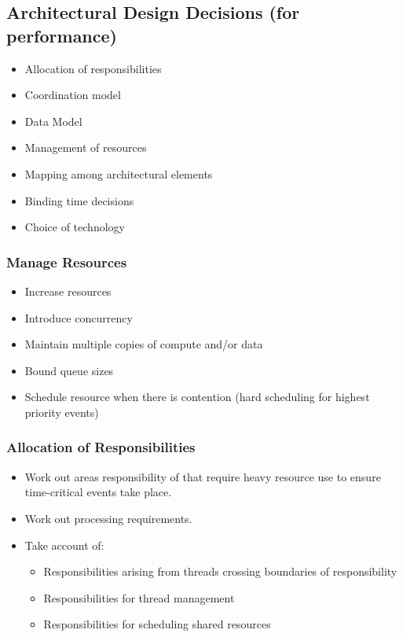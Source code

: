 \documentclass[a4paper]{article}
\begin{document}
\subsection{Architectural Design Decisions (for performance)}
\begin{itemize}
\item{Allocation of responsibilities}
\item{Coordination model}
\item{Data Model}
\item{Management of resources}
\item{Mapping among architectural elements}
\item{Binding time decisions}
\item{Choice of technology}
\end{itemize}

\subsubsection{Manage Resources}

\begin{itemize}
\item{Increase resources}
\item{Introduce concurrency}
\item{Maintain multiple copies of compute and/or data}
\item{Bound queue sizes}
\item{Schedule resource when there is contention (hard scheduling for highest priority events)}
\end{itemize}

\subsubsection{Allocation of Responsibilities}
\begin{itemize}
\item{Work out areas responsibility of that require heavy resource use to ensure time-critical events take place.}
\item{Work out processing requirements.}
\item{Take account of:
	\begin{itemize}
	\item{Responsibilities arising from threads crossing boundaries of responsibility}
	\item{Responsibilities for thread management}
	\item{Responsibilities for scheduling shared resources}
	\end{itemize}
}
\end{itemize}
\end{document}
